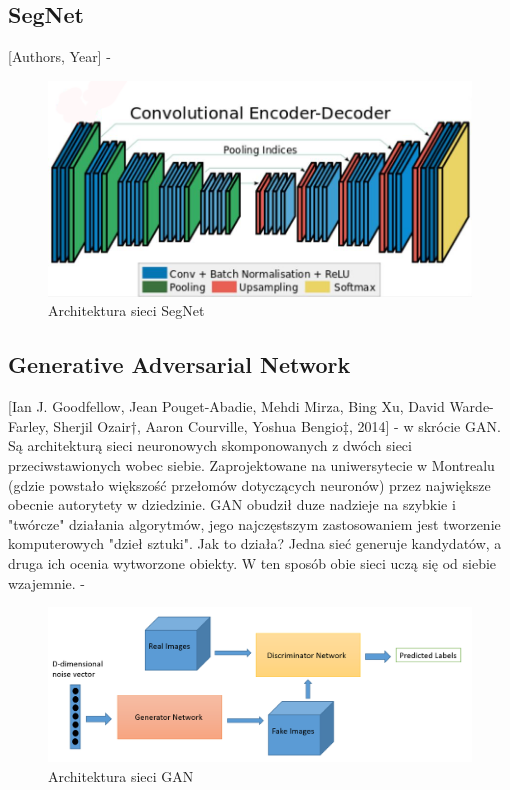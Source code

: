 \documentclass[a4paper,twoside,titlepage,openright]{book}
\begin{document}
\subsection{SegNet}
[Authors, Year] - 
\begin{figure}[h]
	\centering
			\includegraphics[resolution=120]{SegNet.png}
		\caption{Architektura sieci SegNet}
\end{figure}

\subsection{Generative Adversarial Network}
[Ian J. Goodfellow, Jean Pouget-Abadie, Mehdi Mirza, Bing Xu, David Warde-Farley, Sherjil Ozair†, Aaron Courville, Yoshua Bengio‡, 2014] - w skrócie GAN. Są architekturą sieci neuronowych skomponowanych z dwóch sieci przeciwstawionych wobec siebie. Zaprojektowane na uniwersytecie w Montrealu (gdzie powstało większość przełomów dotyczących neuronów) przez największe obecnie autorytety w dziedzinie. GAN obudził duze nadzieje na szybkie i "twórcze" działania algorytmów, jego najczęstszym zastosowaniem jest tworzenie komputerowych "dzieł sztuki". Jak to działa? Jedna sieć generuje kandydatów, a druga ich ocenia wytworzone obiekty. W ten sposób obie sieci uczą się od siebie wzajemnie. -
\begin{figure}[h]
	\centering
			\includegraphics[resolution=120]{GAN.png}
		\caption{Architektura sieci GAN}
\end{figure}
\end{document}
